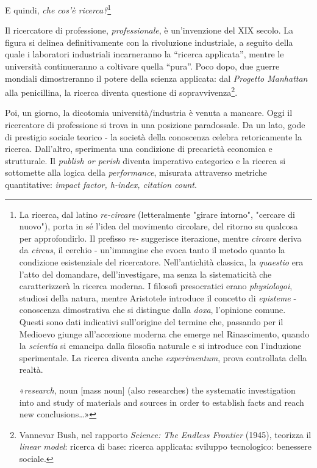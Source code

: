 E quindi, \emph{che cos'è ricerca?}\footnote{%
  La ricerca, dal latino \emph{re-circare} (letteralmente "girare intorno",
  "cercare di nuovo"), porta in sé l'idea del movimento circolare, del ritorno
  su qualcosa per approfondirlo. Il prefisso \emph{re-} suggerisce iterazione,
  mentre \emph{circare} deriva da \emph{circus}, il cerchio - un'immagine che evoca tanto il metodo quanto la condizione esistenziale del ricercatore.
  Nell'antichità classica, la \emph{quaestio} era l'atto del domandare,
  dell'investigare, ma senza la sistematicità che caratterizzerà la ricerca
  moderna. I filosofi presocratici erano \emph{physiologoi}, studiosi della
  natura, mentre Aristotele introduce il concetto di \emph{episteme} -
  conoscenza dimostrativa che si distingue dalla \emph{doxa}, l'opinione
  comune. Questi sono dati indicativi sull'origine del termine che, passando
  per il Medioevo giunge all'accezione moderna che emerge nel Rinascimento, quando la \emph{scientia} si emancipa dalla filosofia naturale e si
  introduce con l'induzione sperimentale. La ricerca diventa anche \emph{experimentum}, prova controllata della realtà.

  «\emph{research}, noun [mass noun] (also researches) the systematic
  investigation into and study of materials and sources in order to establish
  facts and reach new conclusions\ldots»}

Il ricercatore di professione, \emph{professionale}, è un'invenzione del XIX
secolo. La figura si delinea definitivamente con la rivoluzione industriale, a
seguito della quale i laboratori industriali incarneranno la “ricerca applicata”,
mentre le università continueranno a coltivare quella “pura”. %
Poco dopo, due guerre mondiali dimostreranno il potere della scienza applicata:
dal \emph{Progetto Manhattan} alla penicillina, la ricerca diventa questione di sopravvivenza\footnote{Vannevar Bush, nel rapporto \emph{Science: The Endless
Frontier} (1945), teorizza il \emph{linear model}: ricerca di base: ricerca
applicata: sviluppo tecnologico: benessere sociale.}.

Poi, un giorno, la dicotomia università/industria è venuta a mancare. Oggi il
ricercatore di professione si trova in una posizione paradossale. Da un lato,
gode di prestigio sociale teorico - la società della conoscenza celebra
retoricamente la ricerca. Dall'altro, sperimenta una condizione di precarietà
economica e strutturale. Il \emph{publish or perish} diventa imperativo
categorico e la ricerca si sottomette alla logica della \emph{performance},
misurata attraverso metriche quantitative: \emph{impact factor, h-index, citation count}.

